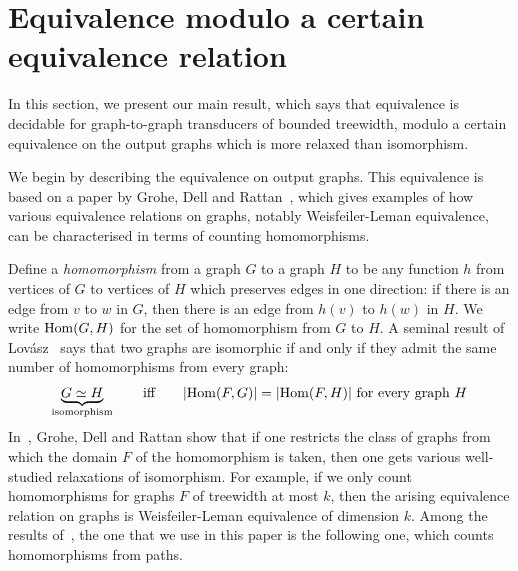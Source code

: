 
\section{Equivalence  modulo a certain equivalence relation}\label{sec:equivalence-modulo}
In this section, we present our main result, which says  that equivalence is decidable for graph-to-graph transducers of bounded treewidth, modulo a certain equivalence on the output graphs which is more relaxed than isomorphism.  

 We begin by describing the equivalence on output graphs.
This equivalence is based on a paper by Grohe, Dell and Rattan~\cite{groheDellRattan2018}, which gives examples of how various equivalence relations on graphs, notably Weisfeiler-Leman equivalence, can be characterised in terms of counting homomorphisms. 

Define a \emph{homomorphism} from a graph $G$ to a graph $H$ to be any function $h$ from vertices of $G$ to vertices of $H$ which preserves edges in one direction: if there is an edge from $v$ to $w$ in $G$, then there is an edge from $h(v)$ to $h(w)$ in $H$. We write $\mathrm {Hom}(G,H)$ for the set of homomorphism from $G$ to $H$. A seminal result of  Lov\'asz~\cite[p.~326]{lovasz1967operations} says that two graphs are isomorphic if and only if they admit the same number of homomorphisms from every graph:
\begin{align*}
\underbrace{G \simeq H}_{\text{isomorphism}} \qquad \text{iff} \qquad  |\mathrm {Hom}(F,G)|=|\mathrm {Hom}(F,H)| \ \text{for every graph $H$}
\end{align*}
In~\cite{groheDellRattan2018},
Grohe, Dell and Rattan show that if one restricts the  class of graphs from which the domain $F$ of the homomorphism is taken, then one gets various well-studied relaxations of isomorphism. For example, if we only count homomorphisms for graphs $F$ of treewidth at most $k$, then the arising equivalence relation on graphs is Weisfeiler-Leman equivalence of dimension $k$.  Among the results of~\cite{groheDellRattan2018}, the one that we use in this paper is the following one, which counts homomorphisms from paths.

